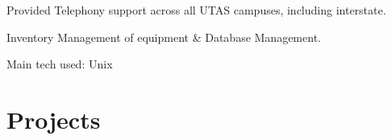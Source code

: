\documentclass[a4paper]{deedy-resume} %
\begin{document}
\begin{minipage}[t]{0.66\textwidth}
\begin{tightitemize}
\item Provided Telephony support across all UTAS campuses, including interstate.
\item Inventory Management of equipment \& Database Management.
\end{tightitemize}
Main tech used: \textbullet{} Unix

\sectionspace %






\section{Projects}


\end{minipage}
\end{document}
